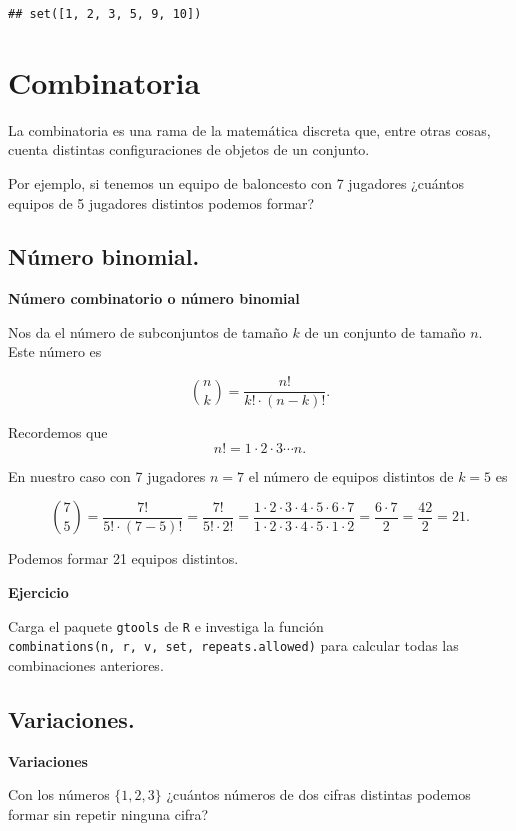 \documentclass[]{book}
\begin{document}
\begin{verbatim}
## set([1, 2, 3, 5, 9, 10])
\end{verbatim}

\hypertarget{combinatoria}{%
\section{Combinatoria}\label{combinatoria}}

La combinatoria es una rama de la matemática discreta que, entre otras cosas, cuenta distintas configuraciones de objetos de un conjunto.

Por ejemplo, si tenemos un equipo de baloncesto con 7 jugadores ¿cuántos equipos de 5 jugadores distintos podemos formar?

\hypertarget{nuxfamero-binomial.}{%
\subsection{Número binomial.}\label{nuxfamero-binomial.}}

\textbf{Número combinatorio o número binomial}

Nos da el número de subconjuntos de tamaño \(k\) de un conjunto de tamaño \(n\). Este número es

\[
\displaystyle{ n \choose k } = \frac{n!}{k!\cdot (n-k)!}.
\]

Recordemos que
\[
n!=1\cdot 2\cdot 3\cdots n.
\]

En nuestro caso con 7 jugadores \(n=7\) el número de equipos distintos de \(k=5\) es

\[
{7\choose 5} = \frac{7!}{5!\cdot (7-5)!}=\frac{7!}{5!\cdot 2!}=
\frac{1\cdot 2\cdot 3 \cdot 4\cdot 5\cdot 6\cdot 7}{1\cdot 2\cdot 3 \cdot 4\cdot 5\cdot 1\cdot 2}=\frac{6\cdot 7}{2}=\frac{42}{2}=21.
\]

Podemos formar 21 equipos distintos.

\textbf{Ejercicio}

Carga el paquete \texttt{gtools} de \texttt{R} e investiga la función \texttt{combinations(n,\ r,\ v,\ set,\ repeats.allowed)} para calcular todas las combinaciones anteriores.

\hypertarget{variaciones.}{%
\subsection{Variaciones.}\label{variaciones.}}

\textbf{Variaciones}

Con los números \(\{1,2,3\}\) ¿cuántos números de dos cifras distintas podemos formar sin repetir ninguna cifra?
\end{document}
